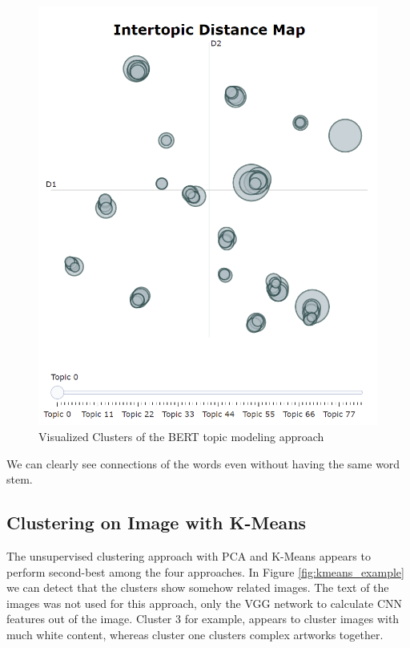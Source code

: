 \documentclass[conference]{IEEEtran}
\begin{document}
\begin{figure}
\centering
\includegraphics[width=1\linewidth]{../Imgs/bert_map}
\caption{Visualized Clusters of the BERT topic modeling approach}
\label{fig:bert_example}
\end{figure}

We can clearly see connections of the words even without having the same word stem. 

\subsection{Clustering on Image with K-Means}

The unsupervised clustering approach with PCA and K-Means appears to perform second-best among the four approaches. In Figure \ref{fig:kmeans_example} we can detect that the clusters show somehow related images. The text of the images was not used for this approach, only the VGG network to calculate CNN features out of the image. Cluster 3 for example, appears to cluster images with much white content, whereas cluster one clusters complex artworks together.
\end{document}
